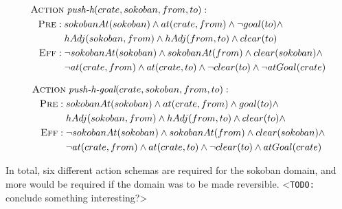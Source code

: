\documentclass[../Master.tex]{subfiles}
\begin{document}
\begin{align}
\begin{split} \label{act:pushh}
    \textsc{Action} &\; \textit{push-h}(crate, sokoban, from, to): \\
    \textsc{Pre}: \; & sokobanAt(sokoban) \land
                       at(crate, from) \land
                       \neg goal(to) \land \\
                     & hAdj(sokoban, from) \land
                       hAdj(from, to) \land
                       clear(to)
                       \\
    \textsc{Eff}: \; & \neg sokobanAt(sokoban) \land
                       sokobanAt(from) \land
                       clear(sokoban) \land \\
                     & \neg at(crate, from) \land
                       at(crate, to) \land
                       \neg clear(to) \land
                       \neg atGoal(crate)
\end{split}
\end{align}

\begin{align}
\begin{split} \label{act:pushhgoal}
    \textsc{Action} &\; \textit{push-h-goal}(crate, sokoban, from, to): \\
    \textsc{Pre}: \; & sokobanAt(sokoban) \land
                       at(crate, from) \land
                       goal(to) \land \\
                     & hAdj(sokoban, from) \land
                       hAdj(from, to) \land
                       clear(to) \land
                       \\
    \textsc{Eff}: \; & \neg sokobanAt(sokoban) \land
                       sokobanAt(from) \land
                       clear(sokoban) \land \\
                     & \neg at(crate, from) \land
                       at(crate, to) \land
                       \neg clear(to) \land
                       atGoal(crate)
\end{split}
\end{align}

In total, six different action schemas are required for the sokoban domain, and more would be required if the domain was to be made reversible. <\texttt{TODO:} conclude something interesting?>
\end{document}
